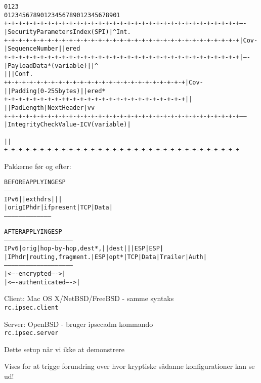 \documentclass[Screen16to9,17pt]{foils}
\begin{document}
\begin{alltt}\small
0                   1                   2                   3
0 1 2 3 4 5 6 7 8 9 0 1 2 3 4 5 6 7 8 9 0 1 2 3 4 5 6 7 8 9 0 1
+-+-+-+-+-+-+-+-+-+-+-+-+-+-+-+-+-+-+-+-+-+-+-+-+-+-+-+-+-+-+-+-+ ----
|               Security Parameters Index (SPI)                 | ^Int.
+-+-+-+-+-+-+-+-+-+-+-+-+-+-+-+-+-+-+-+-+-+-+-+-+-+-+-+-+-+-+-+-+ |Cov-
|                      Sequence Number                          | |ered
+-+-+-+-+-+-+-+-+-+-+-+-+-+-+-+-+-+-+-+-+-+-+-+-+-+-+-+-+-+-+-+-+ | ----
|                    Payload Data* (variable)                   | |   ^
|                                                               | |Conf.
+               +-+-+-+-+-+-+-+-+-+-+-+-+-+-+-+-+-+-+-+-+-+-+-+-+ |Cov-
|               |     Padding (0-255 bytes)                     | |ered*
+-+-+-+-+-+-+-+-+               +-+-+-+-+-+-+-+-+-+-+-+-+-+-+-+-+ |   |
|                               |  Pad Length   | Next Header   | v   v
+-+-+-+-+-+-+-+-+-+-+-+-+-+-+-+-+-+-+-+-+-+-+-+-+-+-+-+-+-+-+-+-+ ------
|         Integrity Check Value-ICV   (variable)                |
~                                                               ~
|                                                               |
+-+-+-+-+-+-+-+-+-+-+-+-+-+-+-+-+-+-+-+-+-+-+-+-+-+-+-+-+-+-+-+-+
\end{alltt}

Pakkerne før og efter:
\begin{alltt}\small
               BEFORE APPLYING ESP
         ---------------------------------------
   IPv6  |             | ext hdrs |     |      |
         | orig IP hdr |if present| TCP | Data |
         ---------------------------------------



               AFTER APPLYING ESP
         ---------------------------------------------------------
   IPv6  | orig |hop-by-hop,dest*,|   |dest|   |    | ESP   | ESP|
         |IP hdr|routing,fragment.|ESP|opt*|TCP|Data|Trailer|Auth|
         ---------------------------------------------------------
                                   |<---- encrypted ---->|
                               |<---- authenticated ---->|
\end{alltt}




\begin{list1}
\item Client: Mac OS X/NetBSD/FreeBSD - samme syntaks\\
\verb+rc.ipsec.client+
\item Server: OpenBSD - bruger ipsecadm kommando\\
\verb+rc.ipsec.server+
\item Dette setup når vi ikke at demonstrere
\item Vises for at trigge forundring over hvor kryptiske sådanne konfigurationer kan se ud!
\end{list1}
\end{document}
